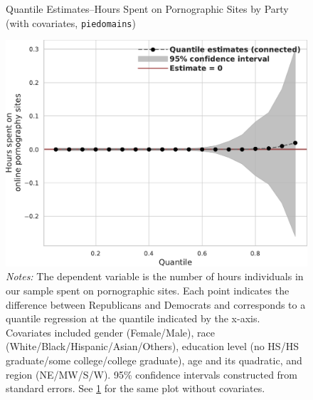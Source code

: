 \documentclass[12pt,twoside]{article}
\begin{document}
\begin{figure}[ht]
	\centering
	\caption{Quantile Estimates--Hours Spent on Pornographic Sites by Party (with covariates, \texttt{piedomains})}
	\includegraphics[width=.55\linewidth]{figs/quantile_reg_covariates_duration_adult.pdf}
	\caption*{\footnotesize \emph{Notes:} 
		The dependent variable is the number of hours individuals in our sample spent on pornographic sites.
		Each point indicates the difference between Republicans and Democrats and corresponds to a quantile regression at the quantile indicated by the x-axis.
		Covariates included gender (Female/Male), race (White/Black/Hispanic/Asian/Others), education level (no HS/HS graduate/some college/college graduate), age and its quadratic, and region (NE/MW/S/W).
		95\% confidence intervals constructed from standard errors.
		See \cref{fig:piedomains_quantile_regression_duration_covariates} for the same plot without covariates.
	}
	\label{fig:piedomains_quantile_regression_duration_covariates}
\end{figure}



\FloatBarrier
\clearpage
\end{document}
